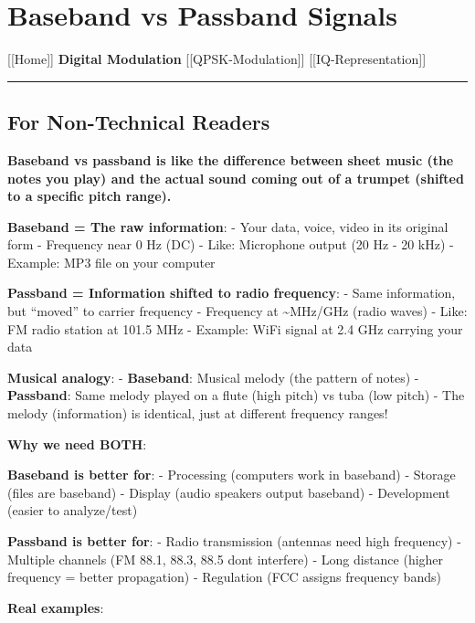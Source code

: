 \section{Baseband vs Passband
Signals}\label{baseband-vs-passband-signals}

{[}{[}Home{]}{]} \textbar{} \textbf{Digital Modulation} \textbar{}
{[}{[}QPSK-Modulation{]}{]} \textbar{} {[}{[}IQ-Representation{]}{]}

\begin{center}\rule{0.5\linewidth}{0.5pt}\end{center}

\subsection{\texorpdfstring{ For Non-Technical
Readers}{ For Non-Technical Readers}}\label{for-non-technical-readers}

\textbf{Baseband vs passband is like the difference between sheet music
(the notes you play) and the actual sound coming out of a trumpet
(shifted to a specific pitch range).}

\textbf{Baseband = The raw information}: - Your data, voice, video in
its original form - Frequency near 0 Hz (DC) - Like: Microphone output
(20 Hz - 20 kHz) - Example: MP3 file on your computer

\textbf{Passband = Information shifted to radio frequency}: - Same
information, but ``moved'' to carrier frequency - Frequency at
\textasciitilde MHz/GHz (radio waves) - Like: FM radio station at 101.5
MHz - Example: WiFi signal at 2.4 GHz carrying your data

\textbf{Musical analogy}: - \textbf{Baseband}: Musical melody (the
pattern of notes) - \textbf{Passband}: Same melody played on a flute
(high pitch) vs tuba (low pitch) - The melody (information) is
identical, just at different frequency ranges!

\textbf{Why we need BOTH}:

\textbf{Baseband is better for}: - Processing (computers work in
baseband) - Storage (files are baseband) - Display (audio speakers
output baseband) - Development (easier to analyze/test)

\textbf{Passband is better for}: - Radio transmission (antennas need
high frequency) - Multiple channels (FM 88.1, 88.3, 88.5
don\textquotesingle t interfere) - Long distance (higher frequency =
better propagation) - Regulation (FCC assigns frequency bands)

\textbf{Real examples}:

